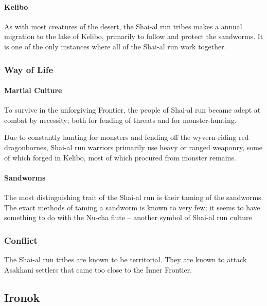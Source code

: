 \documentclass[../main.tex]{subfiles}
\begin{document}
\paragraph{Kelibo}
As with most creatures of the desert, the Shai-al run tribes makes a
annual migration to the lake of Kelibo, primarily to follow and protect the
sandworms. It is one of the only instances where all of the Shai-al run
work together.

\subsubsection{Way of Life}
\paragraph{Martial Culture}
To survive in the unforgiving Frontier, the people of Shai-al run
became adept at combat by necessity; both for fending of threats and
for monster-hunting.

Due to constantly hunting for monsters and fending off the wyvern-riding red
dragonbornes, Shai-al run warriors primarily use heavy or ranged weaponry,
some of which forged in Kelibo, most of which procured from monster remains.
\paragraph{Sandworms}
The most distinguishing trait of the Shai-al run is their taming
of the sandworms. The exact methods of taming a sandworm is known to very few;
it seems to have something to do with the Nu-cha flute -- another
symbol of Shai-al run culture

\subsubsection{Conflict}
The Shai-al run tribes are known to be territorial. They are known to attack
Asakhani settlers that came too close to the Inner Frontier.

\subsection{Ironok}
\end{document}
